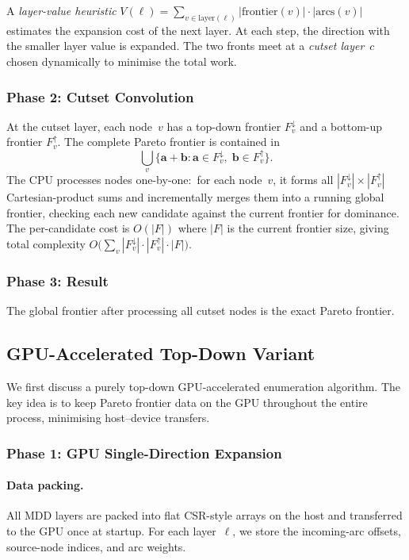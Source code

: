 \documentclass[11pt]{article}
\begin{document}
A \emph{layer-value heuristic}
$V(\ell) = \sum_{v \in \text{layer}(\ell)} |\text{frontier}(v)| \cdot |\text{arcs}(v)|$
estimates the expansion cost of the next layer.
At each step, the direction with the smaller layer value is expanded.
The two fronts meet at a \emph{cutset layer}~$c$ chosen dynamically
to minimise the total work.

\subsubsection{Phase 2: Cutset Convolution}

At the cutset layer, each node~$v$ has a top-down frontier
$F_v^{\downarrow}$ and a bottom-up frontier $F_v^{\uparrow}$.
The complete Pareto frontier is contained in
\[
  \bigcup_{v} \bigl\{ \mathbf{a} + \mathbf{b}
    : \mathbf{a} \in F_v^{\downarrow},\;
      \mathbf{b} \in F_v^{\uparrow} \bigr\}.
\]
The CPU processes nodes one-by-one:\ for each node~$v$, it forms all
$|F_v^{\downarrow}| \times |F_v^{\uparrow}|$ Cartesian-product sums
and incrementally merges them into a running global frontier, checking
each new candidate against the current frontier for dominance.
The per-candidate cost is $O(|F|)$ where $|F|$ is the current frontier
size, giving total complexity
$O\bigl(\sum_v |F_v^{\downarrow}| \cdot |F_v^{\uparrow}| \cdot |F|\bigr)$.

\subsubsection{Phase 3: Result}

The global frontier after processing all cutset nodes is the exact
Pareto frontier.

\subsection{GPU-Accelerated Top-Down Variant}

We first discuss a purely top-down GPU-accelerated enumeration algorithm.
The key idea is to keep Pareto frontier data on the GPU throughout the entire
process, minimising host--device transfers.

\subsubsection{Phase 1: GPU Single-Direction Expansion}

\paragraph{Data packing.}
All MDD layers are packed into flat CSR-style arrays on the host and
transferred to the GPU once at startup.
For each layer~$\ell$, we store the incoming-arc offsets, source-node indices, 
and arc weights.
\end{document}
